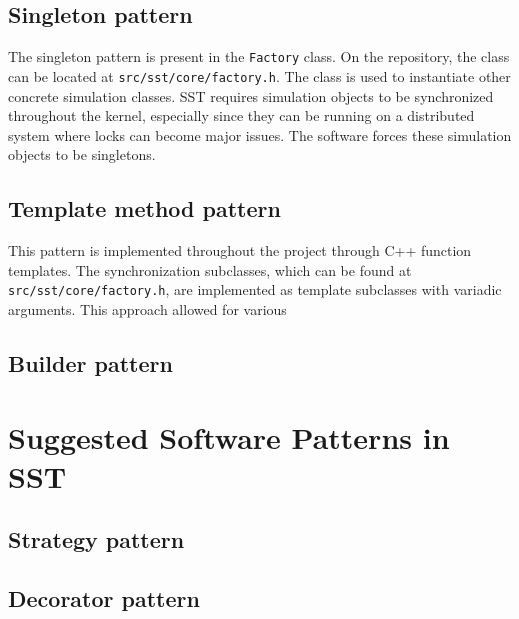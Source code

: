 \documentclass[titlepage]{article}
\begin{document}
\subsection{Singleton pattern}
The singleton pattern is present in the \texttt{Factory} class. On the repository, the class can be located at \texttt{src/sst/core/factory.h}. The class is used to instantiate other concrete simulation classes. SST requires simulation objects to be synchronized throughout the kernel, especially since they can be running on a distributed system where locks can become major issues. The software forces these simulation objects to be singletons.

\subsection{Template method pattern}
This pattern is implemented throughout the project through C++ function templates. The synchronization subclasses, which can be found at \texttt{src/sst/core/factory.h}, are implemented as template subclasses with variadic arguments. This approach allowed for various

\subsection{Builder pattern}

\section{Suggested Software Patterns in SST}

\subsection{Strategy pattern}

\subsection{Decorator pattern}



\end{document}

